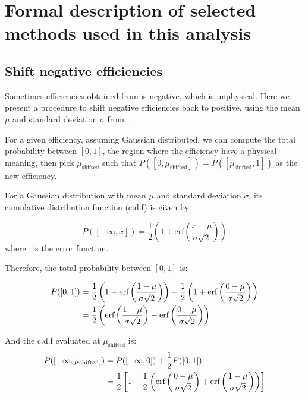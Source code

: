 \chapter{Formal description of selected methods used in this analysis}

\section{Shift negative efficiencies} \label{appx:formal:shift-neg-eff}

Sometimes efficiencies obtained from \sPlot is negative, which is unphysical.
Here we present a procedure to shift negative efficiencies back to positive,
using the mean $\mu$ and standard deviation $\sigma$ from \sPlot.

For a given efficiency, assuming Gaussian distributed,
we can compute the total probability between $[0, 1]$,
the region where the efficiency have a physical meaning,
then pick $\mu_\text{shifted}$ such that
$P([0, \mu_\text{shifted}]) = P([\mu_\text{shifted}, 1])$ as the new efficiency.

For a Gaussian distribution with mean $\mu$ and standard deviation $\sigma$, its
cumulative distribution function (c.d.f) is given by:

\begin{equation}
    P([-\infty, x]) =
        \frac{1}{2} \left( 1 + \text{erf}\left( \frac{x - \mu}{\sigma \sqrt{2}} \right) \right)
\end{equation}
where \erf\ is the error function.

Therefore, the total probability between $[0, 1]$ is:

\begin{align}
    P([0, 1]) &=
        \frac{1}{2} \left( 1 + \text{erf}\left( \frac{1 - \mu}{\sigma \sqrt{2}} \right) \right) -
        \frac{1}{2} \left( 1 + \text{erf}\left( \frac{0 - \mu}{\sigma \sqrt{2}} \right) \right) \\
              & = \frac{1}{2} \left(
                \text{erf}\left( \frac{1 - \mu}{\sigma \sqrt{2}} \right) -
                \text{erf}\left( \frac{0 - \mu}{\sigma \sqrt{2}} \right)
              \right)
\end{align}

And the c.d.f evaluated at $\mu_\text{shifted}$ is:
\begin{align}
    P([-\infty, \mu_\text{shifted}])
        &= P([-\infty, 0]) + \frac{1}{2} P([0, 1]) \\
        &= \frac{1}{2} \left[
            1 + \frac{1}{2} \left(
                \text{erf}\left( \frac{0 - \mu}{\sigma \sqrt{2}} \right) +
                \text{erf}\left( \frac{1 - \mu}{\sigma \sqrt{2}} \right)
            \right)
        \right]
\end{align}

